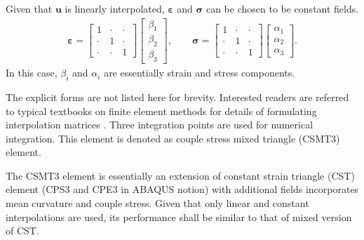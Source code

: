 \documentclass[3p,sort&compress,11pt,fleqn]{elsarticle}
\begin{document}
Given that $\mathbold{u}$ is linearly interpolated, $\mathbold{\varepsilon}$ and $\mathbold{\sigma}$ can be chosen to be constant fields.
\begin{gather}
\mathbold{\varepsilon}=\begin{bmatrix}
1&\cdot&\cdot\\\cdot&1&\cdot\\\cdot&\cdot&1
\end{bmatrix}\begin{bmatrix}
\beta_1\\\beta_2\\\beta_3
\end{bmatrix},\qquad
\mathbold{\sigma}=\begin{bmatrix}
1&\cdot&\cdot\\\cdot&1&\cdot\\\cdot&\cdot&1
\end{bmatrix}\begin{bmatrix}
\alpha_1\\\alpha_2\\\alpha_3
\end{bmatrix}.
\end{gather}
In this case, $\beta_i$ and $\alpha_i$ are essentially strain and stress components.

The explicit forms are not listed here for brevity. Interested readers are referred to typical textbooks on finite element methods for details of formulating interpolation matrices \citep[see, e.g.,][section 5.1.3.1]{Zienkiewicz2013}. Three integration points are used for numerical integration. This element is denoted as couple stress mixed triangle (CSMT3) element.

The CSMT3 element is essentially an extension of constant strain triangle (CST) element (CPS3 and CPE3 in ABAQUS notion) with additional fields incorporates mean curvature and couple stress. Given that only linear and constant interpolations are used, its performance shall be similar to that of mixed version of CST.
\end{document}

